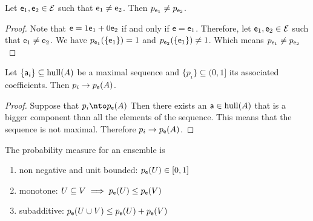 \begin{coro}
	Let $\ens_1, \ens_2 \in \Ens$ such that $\ens_1 \neq \ens_2$. Then $p_{\ens_1} \neq p_{\ens_2}$.
\end{coro}

\begin{proof}
	Note that $\ens = 1 \ens_1 + 0 \ens_2$ if and only if $\ens = \ens_1$. Therefore, let $\ens_1, \ens_2 \in \Ens$ such that $\ens_1 \neq \ens_2$. We have $p_{\ens_1}(\{\ens_1\}) = 1$ and $p_{\ens_2}(\{\ens_1\}) \neq 1$. Which means $p_{\ens_1} \neq p_{\ens_2}$
\end{proof}

\begin{coro}
	Let $\{\ens[a]_i\} \subseteq \hull(A)$ be a maximal sequence and $\{p_i\} \subseteq (0,1]$ its associated coefficients. Then $p_i \to p_{\ens}(A)$.
\end{coro}

\begin{proof}
	Suppose that $p_i \nto p_{\ens}(A)$ Then there exists an $\ens[a] \in \hull(A)$ that is a bigger component than all the elements of the sequence. This means that the sequence is not maximal. Therefore $p_i \to p_{\ens}(A)$.
\end{proof}


\begin{prop}
	The probability measure for an ensemble is
	\begin{enumerate}
		\item non negative and unit bounded: $p_{\ens}(U) \in [0,1]$
		\item monotone: $U \subseteq V \implies p_{\ens}(U) \leq p_{\ens}(V)$
		\item subadditive: $p_{\ens}(U \cup V) \leq p_{\ens}(U) + p_{\ens}(V)$
	\end{enumerate}
\end{prop}

